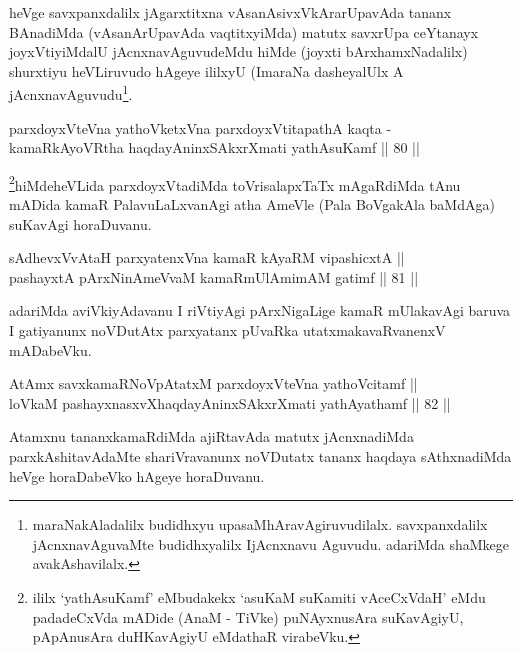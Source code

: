\begin{artha}
heVge savxpanxdalilx jAgarxtitxna vAsanAsivxVkArarUpavAda tananx
BAnadiMda (vAsanArUpavAda vaqtitxyiMda) matutx savxrUpa ceYtanayx
joyxVtiyiMdalU jAcnxnavAguvudeMdu hiMde (joyxti bArxhamxNadalilx)
shurxtiyu heVLiruvudo hAgeye ililxyU (ImaraNa dasheyalUlx A
jAcnxnavAguvudu\footnote{maraNakAladalilx budidhxyu
upasaMhAravAgiruvudilalx. savxpanxdalilx jAcnxnavAguvaMte
budidhxyalilx IjAcnxnavu Aguvudu. adariMda shaMkege avakAshavilalx.}.
\end{artha}


\begin{shl}
parxdoyxVteVna yathoVketxVna parxdoyxVtitapathA kaqta -\\
kamaRkAyoVR\s tha haqdayAninxSAkxrXmati yathAsuKamf \hfill || 80 ||  
\end{shl}

\begin{artha}
\footnote{ililx `yathAsuKamf' eMbudakekx `asuKaM suKamiti vAceCxVdaH'
eMdu padadeCxVda mADide (AnaM - TiVke) puNAyxnusAra suKavAgiyU,
pApAnusAra duHKavAgiyU eMdathaR virabeVku.}hiMdeheVLida parxdoyxVtadiMda toVrisalapxTaTx mAgaRdiMda tAnu
mADida kamaR PalavuLaLxvanAgi atha AmeVle (Pala BoVgakAla baMdAga)
suKavAgi horaDuvanu.
\end{artha}

\begin{shl}
sAdhevxVvAtaH parxyatenxVna kamaR kAyaRM vipashicxtA || \\
pashayxtA pArxNinAmeVvaM kamaRmUlAmimAM gatimf \hfill || 81 ||  
\end{shl}

\begin{artha}
adariMda aviVkiyAdavanu I riVtiyAgi pArxNigaLige kamaR mUlakavAgi
baruva I gatiyanunx noVDutAtx parxyatanx pUvaRka utatxmakavaRvanenxV
mADabeVku.
\end{artha}

\begin{shl}
AtAmx savxkamaRNoVpAtatxM parxdoyxVteVna yathoVcitamf || \\
loVkaM pashayxnasxvXhaqdayAninxSAkxrXmati yathAyathamf \hfill || 82 ||  
\end{shl}

\begin{artha}
Atamxnu tananxkamaRdiMda ajiRtavAda matutx jAcnxnadiMda
parxkAshitavAdaMte shariVravanunx noVDutatx tananx haqdaya
sAthxnadiMda heVge horaDabeVko hAgeye horaDuvanu.
\end{artha}

